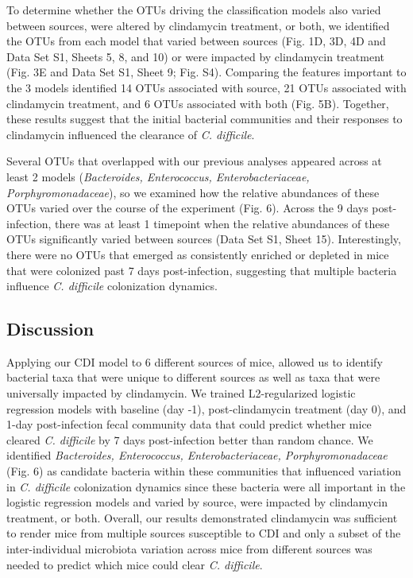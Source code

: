 \documentclass[
  11pt,
]{article}
\begin{document}
To determine whether the OTUs driving the classification models also
varied between sources, were altered by clindamycin treatment, or both,
we identified the OTUs from each model that varied between sources (Fig.
1D, 3D, 4D and Data Set S1, Sheets 5, 8, and 10) or were impacted by
clindamycin treatment (Fig. 3E and Data Set S1, Sheet 9; Fig. S4).
Comparing the features important to the 3 models identified 14 OTUs
associated with source, 21 OTUs associated with clindamycin treatment,
and 6 OTUs associated with both (Fig. 5B). Together, these results
suggest that the initial bacterial communities and their responses to
clindamycin influenced the clearance of \emph{C. difficile}.

Several OTUs that overlapped with our previous analyses appeared across
at least 2 models (\emph{Bacteroides, Enterococcus, Enterobacteriaceae,
Porphyromonadaceae}), so we examined how the relative abundances of
these OTUs varied over the course of the experiment (Fig. 6). Across the
9 days post-infection, there was at least 1 timepoint when the relative
abundances of these OTUs significantly varied between sources (Data Set
S1, Sheet 15). Interestingly, there were no OTUs that emerged as
consistently enriched or depleted in mice that were colonized past 7
days post-infection, suggesting that multiple bacteria influence
\emph{C. difficile} colonization dynamics.

\hypertarget{discussion}{%
\subsection{Discussion}\label{discussion}}

Applying our CDI model to 6 different sources of mice, allowed us to
identify bacterial taxa that were unique to different sources as well as
taxa that were universally impacted by clindamycin. We trained
L2-regularized logistic regression models with baseline (day -1),
post-clindamycin treatment (day 0), and 1-day post-infection fecal
community data that could predict whether mice cleared \emph{C.
difficile} by 7 days post-infection better than random chance. We
identified \emph{Bacteroides, Enterococcus, Enterobacteriaceae,
Porphyromonadaceae} (Fig. 6) as candidate bacteria within these
communities that influenced variation in \emph{C. difficile}
colonization dynamics since these bacteria were all important in the
logistic regression models and varied by source, were impacted by
clindamycin treatment, or both. Overall, our results demonstrated
clindamycin was sufficient to render mice from multiple sources
susceptible to CDI and only a subset of the inter-individual microbiota
variation across mice from different sources was needed to predict which
mice could clear \emph{C. difficile}.
\end{document}
